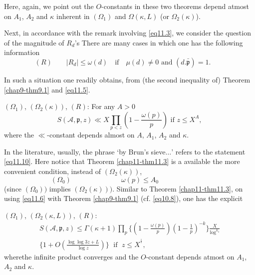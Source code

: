 Here, again, we point out the $O$-constants in these two theorems depend
atmost on $A_1$, $A_2$ and $\kappa$ inherent in $(\Omega_1)$ and
$\Omega(\kappa, L)$ (or $\Omega_2(\kappa)$). 

Next, in accordance with the remark involving \eqref{eq11.3}, we consider
the question of the magnitude of $R_d$'s There are many cases in which
one has the following information 
\begin{equation*}
(R) \qquad | R_d | \le \omega(d) \quad \text{if} \quad \mu(d) \neq 0
  \text{ and } (d. \bar{\mathfrak{p}}) = 1. \qquad \tag{11.9}\label{eq11.9} 
 \end{equation*} 
 
In such a situation one readily obtains, from (the second inequality
of) Theorem \ref{chap9-thm9.1} and \eqref{eq11.5}. 
 \begin{theorem}\label{chap11-thm11.3}%
$(\Omega_1)$, $(\Omega_2 (\kappa))$, $(R)$:  For any $A > 0$
\begin{equation*}
S(\mathscr{A}, \mathfrak{p},z) \ll X \prod_{p < z} (1-\frac{\omega(p)}
{p})\text{ if } z \le X^A,\tag{11.10}\label{eq11.10} 
\end{equation*}
where the $\ll$-constant depends almost on $A$, $A_1$, $A_2$ and $\kappa$.  
\end{theorem}

In the literature, usually, the phrase `by Brun's sieve$\dots$'
refers to the statement \eqref{eq11.10}. Here notice that Theorem
\ref{chap11-thm11.3} is a available  the more convenient condition,
instead of $(\Omega_2(\kappa))$,  
\begin{equation*}
(\Omega_0)  \hspace{3cm} \omega(p) \le A_0 \hspace{3cm}
  \tag{11.11}\label{eq11.11} 
 \end{equation*} 
(since $(\Omega_0))$ implies $(\Omega_2 (\kappa)))$. Similar to Theorem
\ref{chap11-thm11.3}, on using \eqref{eq11.6} with Theorem
\ref{chap9-thm9.1} (cf. \eqref{eq10.8}), one has the explicit 

\begin{theorem}\label{chap11-thm11.4}
$(\Omega_1)$, $(\Omega_2 (\kappa, L))$, $(R)$:
\begin{gather*}
S (\mathscr{A}, \mathfrak{p},z) \le \Gamma (\kappa+1) \prod_{p} \{ (1-\frac
{\omega(p)} {p}) (1 -\frac{1}{p})^{-k}\} \frac{X}{\log^{k{_z}}}\\
 \{ 1+O
(\frac{\log \log  3z+L} {\log z})\} \; \text{ if } \; z \le
X^{^{\frac{1}{2}}},\tag{11.12}\label{eq11.12} 
\end{gather*} 
where\pageoriginale the infinite product converges and the $O$-constant
depends atmost on $A_1$, $A_2$ and $\kappa$.  
\end{theorem}

